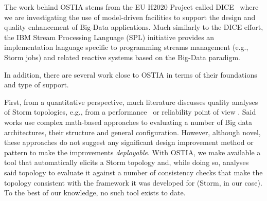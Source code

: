 
The work behind OSTIA stems from the EU H2020 Project called DICE~\cite{dice2020}
where we are investigating the use of model-driven facilities to support the design and quality enhancement of Big-Data applications. Much similarly to the DICE effort, the IBM Stream Processing Language (SPL) initiative \cite{ibmspl} provides an implementation language specific to programming streams management (e.g., Storm jobs) and related reactive systems based on the Big-Data paradigm. 

In addition, there are several work close to OSTIA in terms of their foundations and type of support. 

First, from a quantitative perspective, much literature discusses quality analyses of Storm topologies, e.g., from a performance~\cite{perfbd} or reliability point of view \cite{bigdatareliab}. Said works use complex math-based approaches to evaluating a number of Big data architectures, their structure and general configuration. However, although novel, these approaches do not suggest any significant design improvement method or pattern to make the improvements \emph{deployable}. With OSTIA, we make available a tool that automatically elicits a Storm topology and, while doing so, analyses said topology to evaluate it against a number of consistency checks that make the topology consistent with the framework it was developed for (Storm, in our case). To the best of our knowledge, no such tool exists to date. 

